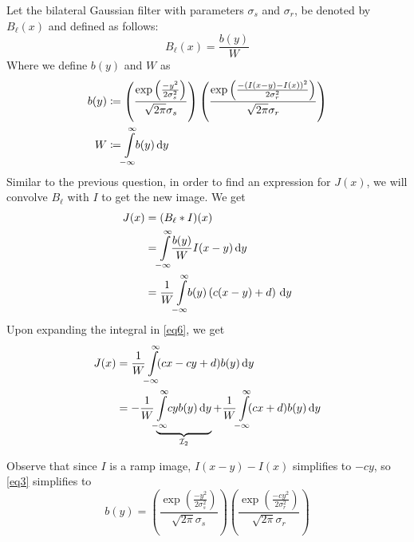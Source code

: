 \documentclass[a4paper]{article}
\begin{document}
\begin{enumerate}
Let the bilateral Gaussian filter with parameters $\sigma_s$ and $\sigma_r$, be denoted by $B_\ell(x)$ and defined as follows:
\begin{equation}
    B_\ell(x) = \frac{b(y)}{W} 
\end{equation}
Where we define $b(y)$ and $W$ as
\begin{align}
b(y) &\coloneqq \left ( \dfrac{\exp\left (\frac{-y^2}{2\sigma_s^2}\right )}{\sqrt{2\pi}\sigma_s} \right ) \left ( \dfrac{\exp\left (\frac{-(I(x - y) - I(x))^2}{2\sigma_r^2}\right )}{\sqrt{2\pi}\sigma_r} \right )\\
W &\coloneqq \int\limits_{\mathclap{-\infty}}^{\mathclap{\infty}}\! b(y)\, \mathrm{d}y
\label{eq3}
\end{align}
Similar to the previous question, in order to find an expression for $J(x)$, we will convolve $B_\ell$ with $I$ to get the new image. We get
\begin{align}
J(x) &= (B_\ell * I)(x) \nonumber \\
&= \int\limits_{\mathclap{-\infty}}^{\mathclap{\infty}}\! \dfrac{b(y)}{W} I (x - y)\, \mathrm{d}y \nonumber \\
&= \dfrac{1}{W}\int\limits_{\mathclap{-\infty}}^{\mathclap{\infty}}\! b(y)\left ( c(x - y) + d\right )\, \mathrm{d}y
\label{eq6}
\end{align}
Upon expanding the integral in \eqref{eq6}, we get
\begin{align}
J(x) &= \dfrac{1}{W}\int\limits_{\mathclap{-\infty}}^{\mathclap{\infty}}\! (cx - cy + d) b(y)\, \mathrm{d}y \nonumber \\
&= -\dfrac{1}{W}\underbrace{\int\limits_{\mathclap{-\infty}}^{\mathclap{\infty}}\! cy b(y)\, \mathrm{d}y}_{\mathcal{I}_2} + \dfrac{1}{W}\int\limits_{\mathclap{-\infty}}^{\mathclap{\infty}}\! (cx + d) b(y)\, \mathrm{d}y
\label{eq5}
\end{align}

Observe that since $I$ is a ramp image, $I(x - y) - I(x)$ simplifies to $-cy$, so \eqref{eq3} simplifies to
\begin{equation}
b(y) = \left ( \dfrac{\exp\left (\frac{-y^2}{2\sigma_s^2}\right )}{\sqrt{2\pi}\sigma_s} \right ) \left ( \dfrac{\exp\left (\frac{-cy^2}{2\sigma_r^2}\right )}{\sqrt{2\pi}\sigma_r} \right )
\label{eq4}
\end{equation}


\end{enumerate}
\end{document}
